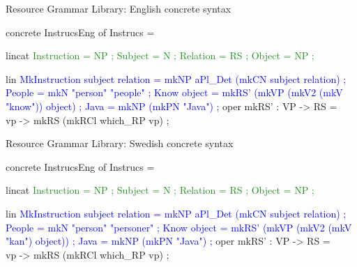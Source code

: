 \begin{frame}[fragile]{Resource Grammar Library: English concrete syntax} \pause
\begin{semiverbatim}
concrete InstrucsEng of Instrucs = {
  lincat\textcolor{ForestGreen}{
    Instruction = \textcolor{Type}{NP} ;
    Subject = \textcolor{Type}{N} ;
    Relation = \textcolor{Type}{RS} ;
    Object = \textcolor{Type}{NP} ;}\pause

  lin \textcolor{Blue}{
   MkInstruction subject relation = 
                    mkNP aPl_Det (mkCN subject relation) ;
   People = mkN \textcolor{String}{"person" "people"} ;
   Know object = mkRS' (mkVP (mkV2 (mkV \textcolor{String}{"know"})) object) ;
   Java = mkNP (mkPN \textcolor{String}{"Java"}) ; }
  oper
     mkRS' : \textcolor{Type}{VP} -> \textcolor{Type}{RS} = \\vp -> mkRS (mkRCl which_RP vp) ;
}
\end{semiverbatim}
\end{frame}

\begin{frame}[fragile]{Resource Grammar Library: Swedish concrete syntax}
\begin{semiverbatim}
concrete InstrucsEng of Instrucs = {
  lincat\textcolor{ForestGreen}{
    Instruction = \textcolor{Type}{NP} ;
    Subject = \textcolor{Type}{N} ;
    Relation = \textcolor{Type}{RS} ;
    Object = \textcolor{Type}{NP} ;}

  lin\textcolor{Blue}{
   MkInstruction subject relation = 
                    mkNP aPl_Det (mkCN subject relation) ;
   People = mkN \textcolor{String}{"person" "personer"} ;
   Know object = mkRS' (mkVP (mkV2 (mkV \textcolor{String}{"kan"}) object)) ;
   Java = mkNP (mkPN \textcolor{String}{"Java"}) ; }
  oper
     mkRS' : \textcolor{Type}{VP} -> \textcolor{Type}{RS} = \\vp -> mkRS (mkRCl which_RP vp) ;
}
\end{semiverbatim}
\end{frame}

\begin{frame}{}
\end{frame}

